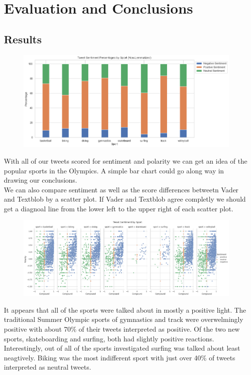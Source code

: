 \documentclass[12pt]{article}
\begin{document}
    \section{Evaluation and Conclusions}
        \subsection{Results}
        \begin{figure}
            \centering
            \includegraphics[width=.9\linewidth]{bar.png}
        \end{figure}
        With all of our tweets scored for sentiment and polarity we can get an idea of the popular sports in the Olympics. A simple bar chart could go along way in drawing our 
        conclusions. \\

        We can also compare sentiment as well as the score differences betweetn Vader and Textblob by a scatter plot. If Vader and Textblob agree completly we should get a 
        diagnoal line from the lower left to the upper right of each scatter plot. 
        \begin{figure}
            \centering
            \includegraphics[scale=0.5, angle =-90]{Sentiment.png}
        \end{figure}

        It appears that all of the sports were talked about in mostly a positive light. The traditional Summer Olympic sports of gymnastics and track were overwelmingly positive with 
        about 70\% of their tweets interpreted as positive. Of the two new sports, skateboarding and surfing, both had slightly positive reactions. Interestingly, out of all of the 
        sports investigated surfing was talked about least neagtively. Biking was the most indifferent sport with just over 40\% of tweets interpreted as neutral tweets. \\
\end{document}
